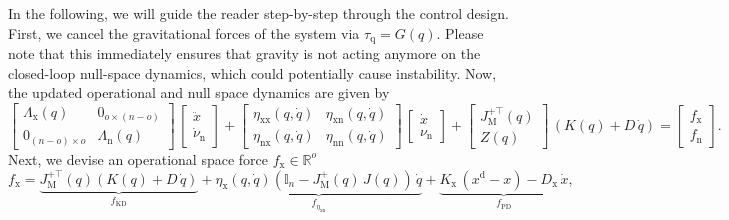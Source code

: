In the following, we will guide the reader step-by-step through the control design.
First, we cancel the gravitational forces of the system via $\tau_\mathrm{q} = G(q)$. Please note that this immediately ensures that gravity is not acting anymore on the closed-loop null-space dynamics, which could potentially cause instability.
Now, the updated operational and null space dynamics are given by
\begin{equation}
    \begin{bmatrix}
        \Lambda_\mathrm{x}(q) & 0_{o \times (n-o)}\\
        0_{(n-o) \times o} & \Lambda_\mathrm{n}(q)
    \end{bmatrix} \, \begin{bmatrix}
        \ddot{x}\\
        \dot{\nu}_\mathrm{n}
    \end{bmatrix} + \begin{bmatrix}
        \eta_\mathrm{xx}(q,\dot{q}) & \eta_\mathrm{xn}(q,\dot{q})\\
        \eta_\mathrm{nx}(q,\dot{q}) & \eta_\mathrm{nn}(q,\dot{q})
    \end{bmatrix} \, \begin{bmatrix}
        \dot{x}\\ \nu_\mathrm{n}
    \end{bmatrix} + \begin{bmatrix}
        J_\mathrm{M}^{+\top}(q)\\
        Z(q)
    \end{bmatrix} \, \left ( K(q) + D \, \dot{q} \right ) = \begin{bmatrix}
        f_\mathrm{x}\\ f_\mathrm{n}
    \end{bmatrix}.
\end{equation}
Next, we devise an operational space force $f_\mathrm{x} \in \mathbb{R}^o$
\begin{equation}
    f_\mathrm{x} = \underbrace{J_\mathrm{M}^{+\top}(q) \left ( K(q) + D \, \dot{q} \right )}_{f_\mathrm{KD}}
    + \underbrace{\eta_\mathrm{x}(q,\dot{q}) \left ( \mathbb{I}_n - J_\mathrm{M}^{+}(q) \, J(q)  \right ) \, \dot{q}}_{f_{\eta_\mathrm{xn}}}
    + \underbrace{K_\mathrm{x} \, (x^\mathrm{d} - x) - D_\mathrm{x} \, \dot{x}}_{f_\mathrm{PD}},
\end{equation}
